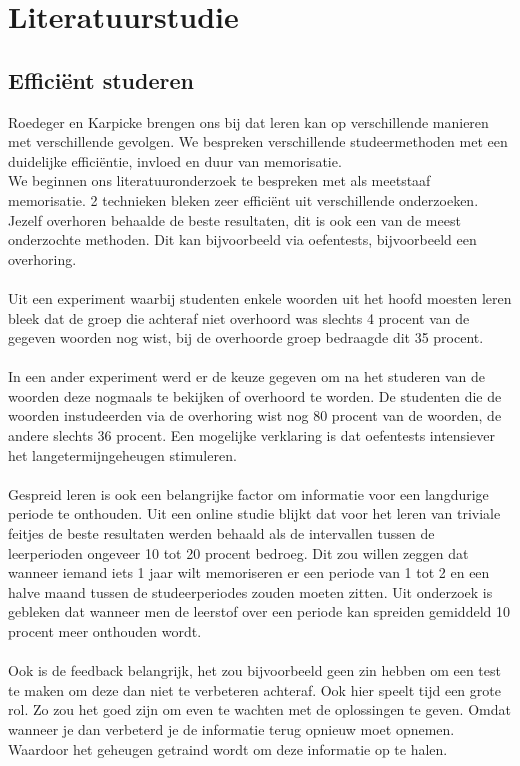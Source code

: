 \documentclass{article}
\begin{document}
\newpage
\section{Literatuurstudie}
\subsection{Efficiënt studeren}


	Roedeger en Karpicke brengen ons bij dat leren kan op verschillende manieren met verschillende gevolgen. We bespreken verschillende studeermethoden met een duidelijke efficiëntie, invloed en duur van memorisatie. 
	\\
	We beginnen ons literatuuronderzoek te bespreken met als meetstaaf memorisatie. 2 technieken bleken zeer efficiënt uit verschillende onderzoeken.
	Jezelf overhoren behaalde de beste resultaten, dit is ook een van de meest onderzochte methoden.
	Dit kan bijvoorbeeld via oefentests, bijvoorbeeld een overhoring.
	\\\\
	Uit een experiment waarbij studenten enkele woorden uit het hoofd moesten leren bleek dat de groep die achteraf niet overhoord was slechts 4 procent van de gegeven woorden nog wist, bij de overhoorde groep bedraagde dit 35 procent. 
	\\\\
	In een ander experiment werd er de keuze gegeven om na het studeren van de woorden deze nogmaals te bekijken of overhoord te worden. De studenten die de woorden instudeerden via de overhoring wist nog 80 procent van de woorden, de andere slechts 36 procent. 
	Een mogelijke verklaring is dat oefentests intensiever het langetermijngeheugen stimuleren.
	\\\\
	Gespreid leren is ook een belangrijke factor om informatie voor een langdurige periode te onthouden.
	Uit een online studie blijkt dat voor het leren van triviale feitjes de beste resultaten werden behaald als de intervallen tussen de leerperioden ongeveer 10 tot 20 procent bedroeg.
	Dit zou willen zeggen dat wanneer iemand iets 1 jaar wilt memoriseren er een periode van 1 tot 2 en een halve maand tussen de studeerperiodes zouden moeten zitten. Uit onderzoek is gebleken dat wanneer men de leerstof over een periode kan spreiden gemiddeld 10 procent meer onthouden wordt.
	\\\\
	Ook is de feedback belangrijk, het zou bijvoorbeeld geen zin hebben om een test te maken om deze dan niet te verbeteren achteraf. Ook hier speelt tijd een grote rol. Zo zou het goed zijn om even te wachten met de oplossingen te geven. Omdat wanneer je dan verbeterd je de informatie terug opnieuw moet opnemen. Waardoor het geheugen getraind wordt om deze informatie op te halen.
\end{document}
